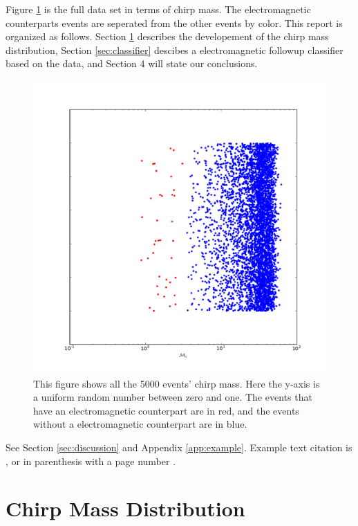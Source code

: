 \documentclass[12pt]{article}
\begin{document}
Figure \ref{fig:chirp} is the full data set in terms of chirp mass. The electromagnetic counterparts events are seperated from the other events by color. This report is organized as follows. Section \ref{sec:dist} describes the developement of the chirp mass distribution, Section \ref{sec:classifier} descibes a electromagnetic followup classifier based on the data, and Section 4 will state our conclusions.
\begin{figure}
\includegraphics[width=\columnwidth]{output/jake/chirp-mass-classes.pdf}
\caption{This figure shows all the 5000 events' chirp mass. Here the y-axis is a uniform random number between zero and one. The events that have an electromagnetic counterpart are in red, and the events without a electromagnetic counterpart are in blue.}
\label{fig:chirp}
\end{figure}
See Section \ref{sec:discussion} and Appendix \ref{app:example}. Example text citation is \textcite{2012ApJ...759...52D}, or in parenthesis with a page number \parencite[pg 2]{2012ApJ...759...52D}.


\section{Chirp Mass Distribution}
\label{sec:dist}
\end{document}
